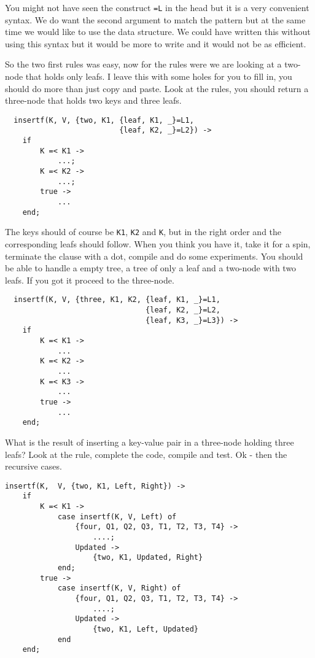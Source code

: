\documentclass[a4paper,11pt]{article}
\begin{document}
You might not have seen the construct {\tt =L} in the head but it is a
very convenient syntax. We do want the second argument to match the
pattern but at the same time we would like to use the data
structure. We could have written this without using this syntax but it
would be more to write and it would not be as efficient.

So the two first rules was easy, now for the rules were we are looking
at a two-node that holds only leafs. I leave this with some holes for
you to fill in, you should do more than just copy and paste. Look at
the rules, you should return a three-node that holds two keys and
three leafs.

\begin{lstlisting}
  insertf(K, V, {two, K1, {leaf, K1, _}=L1,
                          {leaf, K2, _}=L2}) ->
    if 
        K =< K1 ->  
            ...;
        K =< K2 -> 
            ...;
        true ->
            ...
    end;
\end{lstlisting}  

The keys should of course be {\tt K1}, {\tt K2} and {\tt K}, but in
the right order and the corresponding leafs should follow. When you
think you have it, take it for a spin, terminate the clause with a dot,
compile and do some experiments. You should be able to handle a empty
tree, a tree of only a leaf and a two-node with two leafs. If you got
it proceed to the three-node.

\begin{lstlisting}
  insertf(K, V, {three, K1, K2, {leaf, K1, _}=L1,
                                {leaf, K2, _}=L2,
                                {leaf, K3, _}=L3}) ->
    if 
        K =< K1 ->  
            ...
        K =< K2 -> 
            ...
        K =< K3 -> 
            ...
        true ->
            ...
    end;
\end{lstlisting}  

What is the result of inserting a key-value pair in a three-node
holding three leafs? Look at the rule, complete the code, compile and
test. Ok - then the recursive cases.

\begin{lstlisting}
insertf(K,  V, {two, K1, Left, Right}) ->
    if 
        K =< K1 ->
            case insertf(K, V, Left) of
                {four, Q1, Q2, Q3, T1, T2, T3, T4} -> 
                    ....;
                Updated ->
                    {two, K1, Updated, Right}
            end;
        true ->
            case insertf(K, V, Right) of
                {four, Q1, Q2, Q3, T1, T2, T3, T4} -> 
                    ....;
                Updated ->
                    {two, K1, Left, Updated}
            end
    end;
\end{lstlisting}
\end{document}
